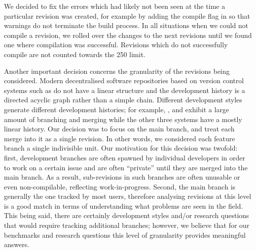 We decided to fix the errors which had likely not been seen at the
time a particular revision was created, for example by adding the
compile flag  in \binutils so that warnings do not
terminate the build process. In all situations when we could not
compile a revision, we rolled over the changes to the next revisions
until we found one where compilation was successful.  Revisions which
do not successfully compile are not counted towards the 250 limit.

Another important decision concerns the granularity of the revisions
being considered.  Modern decentralised software repositories based on
version control systems such as \git do not have a linear structure
and the development history is a directed acyclic graph rather than a
simple chain.  Different development styles generate different
development histories; for example, \git, \redis and \zeromq exhibit a
large amount of branching and merging while the other three systems
have a mostly linear history.  Our decision was to focus on the main branch,
and treat each merge into it as a single revision. In other words, we
considered each feature branch a single indivisible unit.  Our
motivation for this decision was twofold: first, development branches
are often spawned by individual developers in order to work on a
certain issue and are often ``private'' until they are merged into the
main branch.  As a result, sub-revisions in such branches are often
unusable or even non-compilable, reflecting work-in-progress.  Second,
the main branch is generally the one tracked by most users, therefore
analysing revisions at this level is a good match in terms of
understanding what problems are seen in the field.  This being said,
there are certainly development styles and/or research questions that
would require tracking additional branches; however, we believe that
for our benchmarks and research questions this level of granularity
provides meaningful answers.



